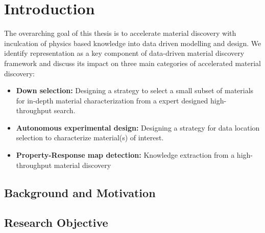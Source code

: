 \chapter{Introduction}\label{chap:intro}
The overarching goal of this thesis is to accelerate material discovery with inculcation of physics based knowledge into data driven modelling and design.
We identify representation as a key component of data-driven material discovery framework and discuss its impact on three main categories of accelerated material discovery:
\begin{itemize}
    \item {\textbf{Down selection: }Designing a strategy to select a small subset of materials for in-depth material characterization from a expert designed high-throughput search.}
    \item {\textbf{Autonomous experimental design: }Designing a strategy for data location selection to characterize material(s) of interest.}
    \item {\textbf{Property-Response map detection: }Knowledge extraction from a high-throughput material discovery }
\end{itemize}
\section{Background and Motivation}\label{sec1.1}
 
\section{Research Objective}\label{sec1.2}

